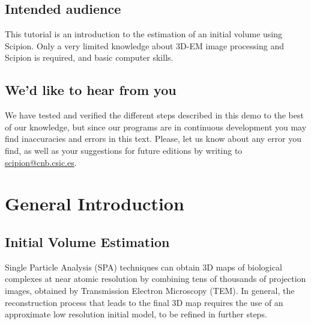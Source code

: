 \documentclass[12pt]{article} %
\begin{document}



\subsection*{Intended audience}

This tutorial is an introduction to the estimation of an initial
volume using Scipion.  Only a very limited knowledge about 3D-EM image
processing and Scipion is required, and basic computer skills.

\subsection*{We'd like to hear from you}

We have tested and verified the different steps described in this demo
to the best of our knowledge, but since our programs are in continuous
development you may find inaccuracies and errors in this text. Please,
let us know about any error you find, as well as your suggestions for
future editions by writing to
\href{mailto:scipion@cnb.csic.es}{scipion@cnb.csic.es}.

\newpage


\tableofcontents %

\newpage %


\section{General Introduction}

\subsection{Initial Volume Estimation}

Single Particle Analysis (SPA) techniques can obtain 3D maps of
biological complexes at near atomic resolution by combining tens of
thousands of projection images, obtained by Transmission Electron
Microscopy (TEM). In general, the reconstruction process that leads to
the final 3D map requires the use of an approximate low resolution
initial model, to be refined in further steps.
\end{document}
